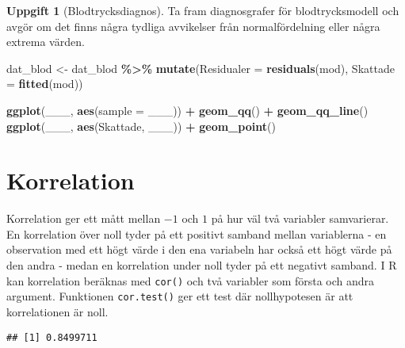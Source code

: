 \documentclass[
]{book}
\newenvironment{Shaded}{\begin{snugshade}}{\end{snugshade}}
\newcommand{\AttributeTok}[1]{\textcolor[rgb]{0.13,0.29,0.53}{#1}}
\newcommand{\FunctionTok}[1]{\textcolor[rgb]{0.13,0.29,0.53}{\textbf{#1}}}
\newcommand{\NormalTok}[1]{#1}
\newcommand{\OtherTok}[1]{\textcolor[rgb]{0.56,0.35,0.01}{#1}}
\newcommand{\SpecialCharTok}[1]{\textcolor[rgb]{0.81,0.36,0.00}{\textbf{#1}}}
\theoremstyle{definition}
\theoremstyle{definition}
\theoremstyle{definition}
\newtheorem{exercise}{Uppgift}[chapter]
\theoremstyle{definition}
\theoremstyle{remark}
\begin{document}
\begin{exercise}[Blodtrycksdiagnos]

Ta fram diagnosgrafer för blodtrycksmodell och avgör om det finns några tydliga avvikelser från normalfördelning eller några extrema värden.

\begin{Shaded}
\begin{Highlighting}[]
\NormalTok{dat\_blod }\OtherTok{\textless{}{-}}\NormalTok{ dat\_blod }\SpecialCharTok{\%\textgreater{}\%} 
  \FunctionTok{mutate}\NormalTok{(}\AttributeTok{Residualer =} \FunctionTok{residuals}\NormalTok{(mod),}
         \AttributeTok{Skattade =} \FunctionTok{fitted}\NormalTok{(mod))}

\FunctionTok{ggplot}\NormalTok{(\_\_\_, }\FunctionTok{aes}\NormalTok{(}\AttributeTok{sample =}\NormalTok{ \_\_\_)) }\SpecialCharTok{+} \FunctionTok{geom\_qq}\NormalTok{() }\SpecialCharTok{+} \FunctionTok{geom\_qq\_line}\NormalTok{()}
\FunctionTok{ggplot}\NormalTok{(\_\_\_, }\FunctionTok{aes}\NormalTok{(Skattade, \_\_\_)) }\SpecialCharTok{+} \FunctionTok{geom\_point}\NormalTok{()}
\end{Highlighting}
\end{Shaded}

\end{exercise}

\hypertarget{korrelation}{%
\section{Korrelation}\label{korrelation}}

Korrelation ger ett mått mellan \(-1\) och \(1\) på hur väl två variabler samvarierar. En korrelation över noll tyder på ett positivt samband mellan variablerna - en observation med ett högt värde i den ena variabeln har också ett högt värde på den andra - medan en korrelation under noll tyder på ett negativt samband. I R kan korrelation beräknas med \texttt{cor()} och två variabler som första och andra argument. Funktionen \texttt{cor.test()} ger ett test där nollhypotesen är att korrelationen är noll.

\begin{Shaded}
\end{Shaded}

\begin{verbatim}
## [1] 0.8499711
\end{verbatim}
\end{document}

